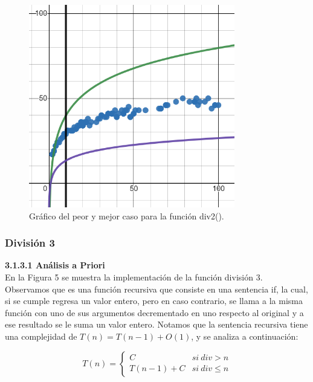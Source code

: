 \documentclass[12pt,twoside]{article}
\begin{document}
                \begin{figure}[H]
                    \centering
                    \includegraphics[width=9cm]{imagenes/div2.png}
                    \caption{Gráfico del peor y mejor caso para la función div2().}
                \end{figure}
                
                
            \subsubsection{\large Divisi\'on 3}
                {\bf 3.1.3.1 Análisis a Priori}
                \\[0.3cm]
                
                En la Figura 5 se muestra la implementación de la función división 3. Observamos que es una función recursiva que consiste en una sentencia if, la cual, si se cumple regresa un valor entero, pero en caso contrario, se llama a la misma función con uno de sus argumentos decrementado en uno respecto al original y a ese resultado se le suma un valor entero. 
                Notamos que la sentencia recursiva tiene una complejidad de $T(n)=T(n-1)+O(1)$, y se analiza a continuación:
                
                \newpage


                $$T(n)= \left\{ \begin{array}{cl}
                C & si \ div >  n \\
                T(n-1) + C & si\ div \le  n
                \end{array} \right.$$
                
                
                
\end{document}
